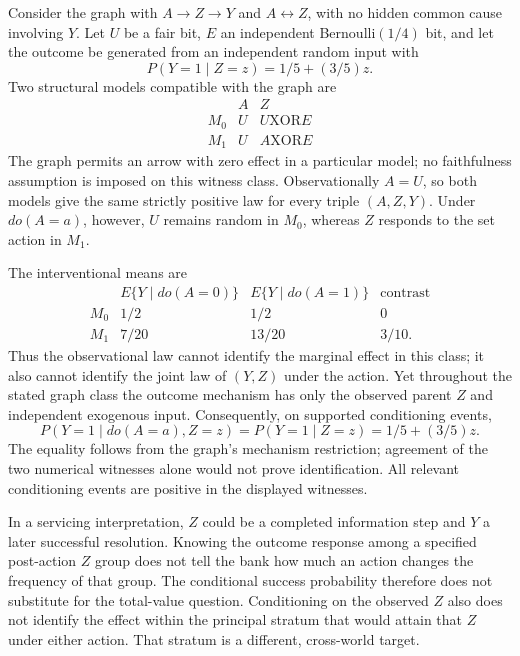 Consider the graph with $A\to Z\to Y$ and $A\leftrightarrow Z$,
with no hidden common cause involving $Y$. Let $U$ be a fair bit,
$E$ an independent Bernoulli$(1/4)$ bit, and let the outcome be generated
from an independent random input with
\[
 P(Y=1\mid Z=z)=1/5+(3/5)z.
\]
Two structural models compatible with the graph are
\[
\begin{array}{c|cc}
 & A&Z\\ \hline
 M_0&U&U\mathbin{\mathrm{XOR}}E\\
 M_1&U&A\mathbin{\mathrm{XOR}}E
\end{array}
\]
The graph permits an arrow with zero effect in a particular model;
no faithfulness assumption is imposed on this witness class.
Observationally $A=U$, so both models give the same strictly positive
law for every triple $(A,Z,Y)$. Under $do(A=a)$, however, $U$ remains
random in $M_0$, whereas $Z$ responds to the set action in
$M_1$.~\citep{exec17_s3_exact}

The interventional means are
\[
\begin{array}{c|cc|c}
 &E\{Y\mid do(A=0)\}&E\{Y\mid do(A=1)\}&\text{contrast}\\ \hline
 M_0&1/2&1/2&0\\
 M_1&7/20&13/20&3/10 .
\end{array}
\]
Thus the observational law cannot identify the marginal effect in
this class; it also cannot identify the joint law of $(Y,Z)$ under
the action. Yet throughout the stated graph class the outcome mechanism
has only the observed parent $Z$ and independent exogenous input.
Consequently, on supported conditioning events,
\[
 P(Y=1\mid do(A=a),Z=z)=P(Y=1\mid Z=z)
                     =1/5+(3/5)z.
\]
The equality follows from the graph's mechanism restriction; agreement
of the two numerical witnesses alone would not prove identification.
All relevant conditioning events are positive in the displayed
witnesses.~\citep{id2006,exec17_s3_exact}

In a servicing interpretation, $Z$ could be a completed information
step and $Y$ a later successful resolution. Knowing the outcome response
among a specified post-action $Z$ group does not tell the bank how much
an action changes the frequency of that group. The conditional success
probability therefore does not substitute for the total-value question.
Conditioning on the observed $Z$ also does not identify the effect
within the principal stratum that would attain that $Z$ under either
action. That stratum is a different, cross-world target.

